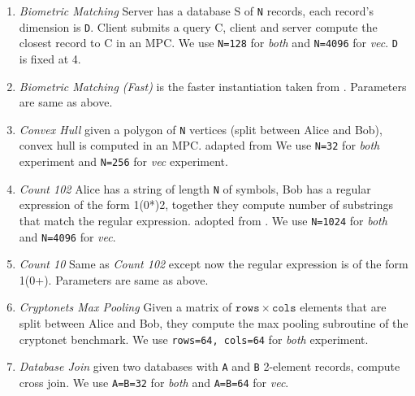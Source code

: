
\begin{enumerate}
    \item {\em Biometric Matching} Server has a database S of {\tt N} records, each record's dimension is {\tt D}. Client submits a query C, client and server compute the closest record to C in an MPC. We use {\tt N=128} for {\em both} and {\tt N=4096} for {\em vec}. {\tt D} is fixed at 4.
    
    \item {\em Biometric Matching (Fast)} is the faster instantiation taken from . Parameters are same as above.
    
    \item {\em Convex Hull} given a polygon of {\tt N} vertices (split between Alice and Bob), convex hull is computed in an MPC. adapted from  We use {\tt N=32} for {\em both} experiment and {\tt N=256} for {\em vec} experiment.
    
    \item {\em Count 102} Alice has a string of length {\tt N} of symbols, Bob has a regular expression of the form 1(0*)2, together they compute number of substrings that match the regular expression. adopted from . We use {\tt N=1024} for {\em both} and {\tt N=4096} for {\em vec}.
    
    \item {\em Count 10} Same as {\em Count 102} except now the regular expression is of the form 1(0+). Parameters are same as above.
    
    \item {\em Cryptonets Max Pooling} Given a matrix of $\mathtt{rows}\times\mathtt{cols}$ elements that are split between Alice and Bob, they compute the max pooling subroutine of the cryptonet benchmark. We use {\tt rows=64, cols=64} for {\em both} experiment.

    \item {\em Database Join} given two databases with {\tt A} and {\tt B} 2-element records, compute cross join. We use {\tt A=B=32} for {\em both} and {\tt A=B=64} for {\em vec}.
    

\end{enumerate}
